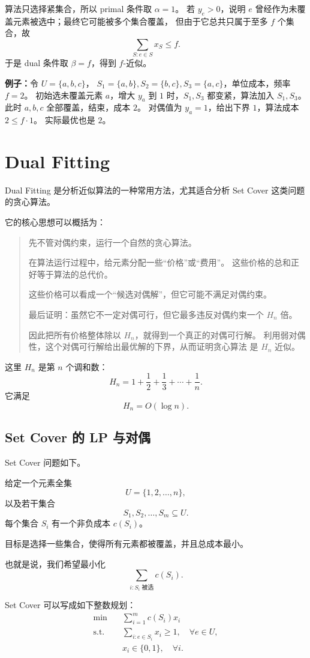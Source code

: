 \documentclass[UTF8,openany,12pt]{ctexbook}
\theoremstyle{remark}
\begin{document}
算法只选择紧集合，所以 primal 条件取 $\alpha=1$。
若 $y_e>0$，说明 $e$ 曾经作为未覆盖元素被选中；最终它可能被多个集合覆盖，
但由于它总共只属于至多 $f$ 个集合，故
\[
  \sum_{S:e\in S}x_S\le f.
\]
于是 dual 条件取 $\beta=f$，得到 $f$-近似。

\textbf{例子：}令 $U=\{a,b,c\}$，
$S_1=\{a,b\},S_2=\{b,c\},S_3=\{a,c\}$，单位成本，频率 $f=2$。
初始选未覆盖元素 $a$，增大 $y_a$ 到 $1$ 时，$S_1,S_3$ 都变紧，算法加入 $S_1,S_3$。
此时 $a,b,c$ 全部覆盖，结束，成本 $2$。
对偶值为 $y_a=1$，给出下界 $1$，算法成本 $2\le f\cdot1$。
实际最优也是 $2$。

\section{Dual Fitting}

Dual Fitting 是分析近似算法的一种常用方法，尤其适合分析
Set Cover 这类问题的贪心算法。

它的核心思想可以概括为：

\begin{quote}
  先不管对偶约束，运行一个自然的贪心算法。

  在算法运行过程中，给元素分配一些“价格”或“费用”。
  这些价格的总和正好等于算法的总代价。

  这些价格可以看成一个“候选对偶解”，但它可能不满足对偶约束。

  最后证明：虽然它不一定对偶可行，但它最多违反对偶约束一个
  $H_n$ 倍。

  因此把所有价格整体除以 $H_n$，就得到一个真正的对偶可行解。
  利用弱对偶性，这个对偶可行解给出最优解的下界，从而证明贪心算法
  是 $H_n$ 近似。
\end{quote}

这里 $H_n$ 是第 $n$ 个调和数：
\[
  H_n = 1+\frac12+\frac13+\cdots+\frac1n.
\]
它满足
\[
  H_n = O(\log n).
\]

\subsection{Set Cover 的 LP 与对偶}

Set Cover 问题如下。

给定一个元素全集
\[
  U=\{1,2,\dots,n\},
\]
以及若干集合
\[
  S_1,S_2,\dots,S_m \subseteq U.
\]
每个集合 $S_i$ 有一个非负成本 $c(S_i)$。

目标是选择一些集合，使得所有元素都被覆盖，并且总成本最小。

也就是说，我们希望最小化
\[
  \sum_{i:S_i\text{ 被选}} c(S_i).
\]

Set Cover 可以写成如下整数规划：
\[
\begin{aligned}
\min \quad & \sum_{i=1}^m c(S_i)x_i \\
\text{s.t.}\quad
& \sum_{i:e\in S_i} x_i \ge 1, \quad \forall e\in U,\\
& x_i\in\{0,1\}, \quad \forall i.
\end{aligned}
\]
\end{document}
